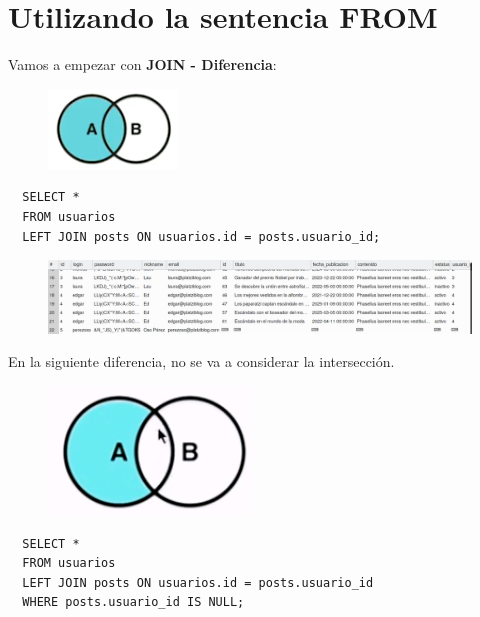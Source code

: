 \documentclass{article}
\begin{document}
\section{Utilizando la sentencia FROM}%
Vamos a empezar con \textbf{JOIN - Diferencia}:

\begin{figure}[h!]
  \centering
  \includegraphics[scale=0.75]{./Pictures/089_join_left.png}
\end{figure}

\begin{verbatim}
  SELECT *
  FROM usuarios
  LEFT JOIN posts ON usuarios.id = posts.usuario_id;
\end{verbatim}

\begin{figure}[h!]
  \centering
  \includegraphics[scale=0.5]{./Pictures/087_join_left.png}
\end{figure}

\newpage

En la siguiente diferencia, no se va a considerar la intersección.\\

\begin{figure}[h!]
  \centering
  \includegraphics[scale=0.65]{./Pictures/088_join_left_perezoso.png}
\end{figure}

\begin{verbatim}
  SELECT *
  FROM usuarios
  LEFT JOIN posts ON usuarios.id = posts.usuario_id
  WHERE posts.usuario_id IS NULL;
\end{verbatim}
\end{document}
